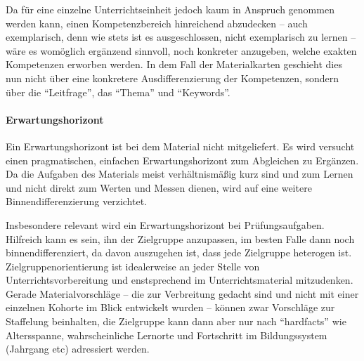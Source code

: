 
Da für eine einzelne Unterrichtseinheit jedoch kaum in Anspruch genommen werden kann, einen Kompetenzbereich hinreichend abzudecken -- auch exemplarisch, denn wie stets ist es ausgeschlossen, nicht exemplarisch zu lernen  -- wäre es womöglich ergänzend sinnvoll, noch konkreter anzugeben, welche exakten Kompetenzen erworben werden.
In dem Fall der Materialkarten geschieht dies nun nicht über eine konkretere Ausdifferenzierung der Kompetenzen, sondern über die \enquote{Leitfrage}, das \enquote{Thema} und \enquote{Keywords}. 


\paragraph{Erwartungshorizont}
Ein Erwartungshorizont ist bei dem Material nicht mitgeliefert.
Es wird versucht einen pragmatischen, einfachen Erwartungshorizont zum Abgleichen zu Ergänzen. Da die Aufgaben des Materials meist verhältnismäßig kurz sind und zum Lernen und nicht direkt zum Werten und Messen dienen, wird auf eine weitere Binnendifferenzierung verzichtet. 

Insbesondere relevant wird ein Erwartungshorizont bei Prüfungsaufgaben. Hilfreich kann es sein, ihn der Zielgruppe anzupassen, im besten Falle dann noch binnendifferenziert, da davon auszugehen ist, dass jede Zielgruppe heterogen ist.
Zielgruppenorientierung ist idealerweise an jeder Stelle von Unterrichtsvorbereitung und enstsprechend im Unterrichtsmaterial mitzudenken. 
Gerade Materialvorschläge -- die zur Verbreitung gedacht sind und nicht mit einer einzelnen Kohorte im Blick entwickelt wurden -- können zwar Vorschläge zur Staffelung beinhalten, die Zielgruppe kann dann aber nur nach \enquote{hardfacts} wie Altersspanne, wahrscheinliche Lernorte und Fortschritt im Bildungssystem (Jahrgang \gls{etc}) adressiert werden. 




